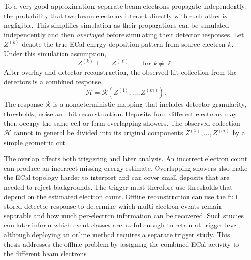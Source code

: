 To a very good approximation, separate beam electrons propagate
independently: the probability that two beam electrons interact directly with
each other is negligible. This simplifies simulation as their propagations 
can be simulated independently and then \emph{overlayed} before simulating their detector responses. Let
\(Z^{(k)}\) denote the true ECal energy-deposition pattern from source
electron \(k\).  Under this simulation assumption,
\begin{equation}
    Z^{(k)} \perp\!\!\!\perp Z^{(\ell)}
    \qquad \text{for } k\neq\ell .
\end{equation}
After overlay and detector reconstruction, the observed hit collection from the detectors is a
combined response,
\begin{equation}
    \mathcal{H}
    =
    \mathcal{R}\!\left(
        Z^{(1)},\ldots,Z^{(m)}
    \right).
\end{equation}
The response \(\mathcal{R}\) is a nondeterministic mapping that includes detector granularity, thresholds,
noise and hit reconstruction. Deposits from different electrons may then
occupy the same cell or form overlapping showers. The observed collection
\(\mathcal{H}\) cannot in general be divided into its original components $Z^{(1)},\ldots,Z^{(m)}$ by
a simple geometric cut.

The overlap affects both triggering and later analysis. An
incorrect electron count can produce an incorrect missing-energy estimate.
Overlapping showers also make the ECal topology harder to interpret and can
cover small deposits that are needed to reject backgrounds. The trigger must
therefore use thresholds that depend on the estimated electron count.
Offline reconstruction can use the full stored detector response to determine
which multi-electron events remain separable and how much per-electron
information can be recovered. Such studies can later inform which event
classes are useful enough to retain at trigger level, although deploying an
online method requires a separate trigger study. This thesis addresses the
offline problem by assigning the combined ECal activity to the different beam
electrons \cite{ldmx2025-overview}.

